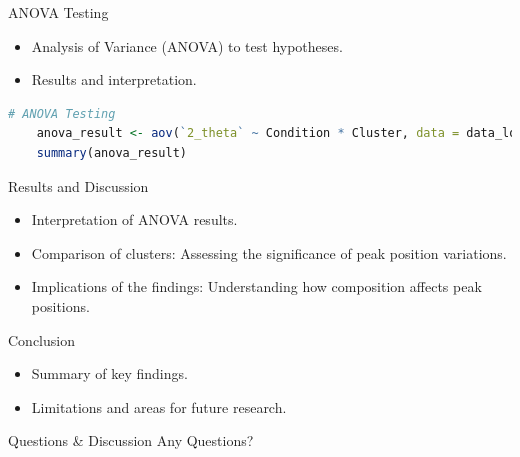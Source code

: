 \documentclass{beamer}
\begin{document}
\begin{frame}[fragile]{ANOVA Testing}
    \begin{itemize}
        \item Analysis of Variance (ANOVA) to test hypotheses.
        \item Results and interpretation.
    \end{itemize}

    \begin{lstlisting}[language=R]
    # ANOVA Testing
    anova_result <- aov(`2_theta` ~ Condition * Cluster, data = data_long)
    summary(anova_result)
    \end{lstlisting}
\end{frame}

\begin{frame}{Results and Discussion}
    \begin{itemize}
        \item Interpretation of ANOVA results.
        \item Comparison of clusters: Assessing the significance of peak position variations.
        \item Implications of the findings: Understanding how composition affects peak positions.
    \end{itemize}
\end{frame}

\begin{frame}{Conclusion}
    \begin{itemize}
        \item Summary of key findings.
        \item Limitations and areas for future research.
    \end{itemize}
\end{frame}

\begin{frame}{Questions \& Discussion}
    \centering
    \Huge Any Questions?
\end{frame}
\end{document}
